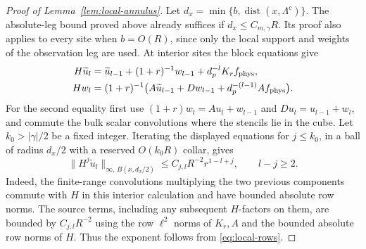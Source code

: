 \documentclass[11pt]{article}
\theoremstyle{definition}
\begin{document}
\begin{proof}[Proof of Lemma~\ref{lem:local-annulus}]
Let \(d_x=\min\{b,\operatorname{dist}(x,\Lambda^c)\}\).
The absolute-leg bound proved above already suffices if
\(d_x\le C_{m,\gamma}R\). Its proof also applies to every site
when \(b=O(R)\), since only the local support and weights of
the observation leg are used. At interior sites the block
equations give
\begin{equation}
 \begin{aligned}
 H\widetilde u_l &=
    \widetilde u_{l-1}+(1+r)^{-1}w_{l-1}
                  +d_p^{-l}K_r f_{\rm phys},\\
 H w_l &=(1+r)^{-1}
     \bigl(A\widetilde u_{l-1}+D w_{l-1}
                        +d_p^{-(l-1)}A f_{\rm phys}\bigr).
 \end{aligned}
\end{equation}
For the second equality first use
\((1+r)w_l=A u_l+w_{l-1}\) and
\(D u_l=u_{l-1}+w_l\), and commute the bulk scalar convolutions
where the stencils lie in the cube. Let \(k_0>|\gamma|/2\) be
a fixed integer. Iterating the displayed equations for
\(j\le k_0\), in a ball of radius \(d_x/2\) with a reserved
\(O(k_0R)\) collar, gives
\begin{equation}
 \|H^j\widetilde u_l\|_{\infty,\,B(x,d_x/2)}
 \le C_{j,l} R^{-2}r^{1-l+j},\qquad l-j\ge2.
\end{equation}
Indeed, the finite-range convolutions multiplying the two
previous components commute with \(H\) in this interior
calculation and have bounded absolute row norms. The source
terms, including any subsequent \(H\)-factors on them, are
bounded by \(C_{j,l}R^{-2}\) using the row \(\ell^2\) norms of
\(K_r,A\) and the bounded absolute row norms of \(H\).
Thus the exponent follows from \eqref{eq:local-rows}.


\end{proof}
\end{document}
